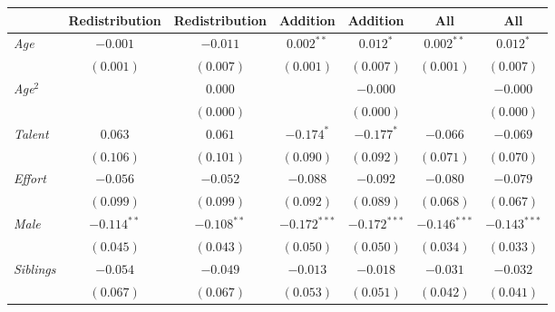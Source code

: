 
\begin{table}[H]
\begin{center}
\begin{footnotesize}
\begin{tabular}{l c c c c c c}
\toprule
 & Redistribution & Redistribution & Addition & Addition & All & All \\
\midrule
\textit{Age}                                  & $-0.001$      & $-0.011$      & $0.002^{**}$   & $0.012^{*}$    & $0.002^{**}$   & $0.012^{*}$    \\
                                              & $(0.001)$     & $(0.007)$     & $(0.001)$      & $(0.007)$      & $(0.001)$      & $(0.007)$      \\
\textit{Age}$^2$                              &               & $0.000$       &                & $-0.000$       &                & $-0.000$       \\
                                              &               & $(0.000)$     &                & $(0.000)$      &                & $(0.000)$      \\
\textit{Talent}                               & $0.063$       & $0.061$       & $-0.174^{*}$   & $-0.177^{*}$   & $-0.066$       & $-0.069$       \\
                                              & $(0.106)$     & $(0.101)$     & $(0.090)$      & $(0.092)$      & $(0.071)$      & $(0.070)$      \\
\textit{Effort}                               & $-0.056$      & $-0.052$      & $-0.088$       & $-0.092$       & $-0.080$       & $-0.079$       \\
                                              & $(0.099)$     & $(0.099)$     & $(0.092)$      & $(0.089)$      & $(0.068)$      & $(0.067)$      \\
\textit{Male}                                 & $-0.114^{**}$ & $-0.108^{**}$ & $-0.172^{***}$ & $-0.172^{***}$ & $-0.146^{***}$ & $-0.143^{***}$ \\
                                              & $(0.045)$     & $(0.043)$     & $(0.050)$      & $(0.050)$      & $(0.034)$      & $(0.033)$      \\
\textit{Siblings}                             & $-0.054$      & $-0.049$      & $-0.013$       & $-0.018$       & $-0.031$       & $-0.032$       \\
                                              & $(0.067)$     & $(0.067)$     & $(0.053)$      & $(0.051)$      & $(0.042)$      & $(0.041)$      \\

\end{tabular}
\end{footnotesize}
\end{center}
\end{table}
